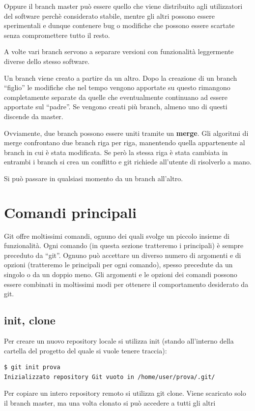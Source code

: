 \documentclass{article}
\begin{document}
Oppure il branch master può essere quello che viene distribuito agli
utilizzatori del software perchè considerato stabile, mentre gli altri possono
essere sperimentali e dunque contenere bug o modifiche che possono essere 
scartate senza compromettere tutto il resto. 

A volte vari branch servono a separare versioni
con funzionalità leggermente diverse dello stesso software.

Un branch viene creato a partire da un altro. Dopo la creazione di un branch
``figlio'' le modifiche che nel tempo vengono apportate su questo rimangono
completamente separate da quelle che eventualmente continuano ad essere
apportate sul ``padre''. Se vengono creati più branch, almeno uno di questi discende
da master.

Ovviamente, due branch possono essere uniti tramite un \textbf{merge}. Gli
algoritmi di merge confrontano due branch riga per riga, manentendo quella
appartenente al branch in cui è stata modificata. Se però la stessa riga è stata
cambiata in entrambi i branch si crea un conflitto e git richiede all'utente di 
risolverlo a mano.

Si può passare in qualsiasi momento da un branch all'altro.

\section{Comandi principali}
Git offre moltissimi comandi, ognuno dei quali svolge un piccolo insieme di
funzionalità. Ogni comando (in questa sezione tratteremo i principali) è sempre preceduto da
``git''. Ognuno può accettare un diverso numero di argomenti e di opzioni
(tratteremo le principali per ogni comando), spesso precedute da un singolo o da
un doppio meno. Gli argomenti e le opzioni dei comandi possono essere combinati
in moltissimi modi per ottenere il comportamento desiderato da git.

\subsection{init, clone}
Per creare un nuovo repository locale si utilizza init (stando all'interno
della cartella del progetto del quale si vuole tenere traccia):

\begin{verbatim}
$ git init prova
Inizializzato repository Git vuoto in /home/user/prova/.git/
\end{verbatim}

Per copiare un intero repository remoto si utilizza git clone. Viene scaricato
solo il branch master, ma una volta clonato si può accedere a tutti gli altri
\end{document}
